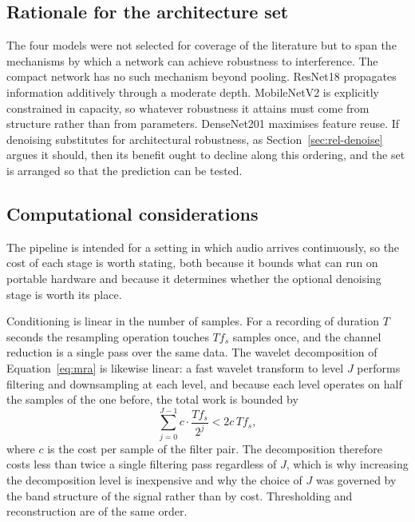\documentclass[pdflatex,sn-mathphys-num]{sn-jnl}
\begin{document}
\subsection{Rationale for the architecture set}\label{sec:d-why}

The four models were not selected for coverage of the literature but to span
the mechanisms by which a network can achieve robustness to interference. The
compact network has no such mechanism beyond pooling. ResNet18 propagates
information additively through a moderate depth. MobileNetV2 is explicitly
constrained in capacity, so whatever robustness it attains must come from
structure rather than from parameters. DenseNet201 maximises feature reuse.
If denoising substitutes for architectural robustness, as
Section~\ref{sec:rel-denoise} argues it should, then its benefit ought to
decline along this ordering, and the set is arranged so that the prediction
can be tested.

\subsection{Computational considerations}\label{sec:d-cost}

The pipeline is intended for a setting in which audio arrives continuously, so
the cost of each stage is worth stating, both because it bounds what can run
on portable hardware and because it determines whether the optional denoising
stage is worth its place.

Conditioning is linear in the number of samples. For a recording of duration
$T$ seconds the resampling operation touches $T f_s$ samples once, and the
channel reduction is a single pass over the same data. The wavelet
decomposition of Equation~\eqref{eq:mra} is likewise linear: a fast wavelet
transform to level $J$ performs filtering and downsampling at each level, and
because each level operates on half the samples of the one before, the total
work is bounded by
\begin{equation}
\sum_{j=0}^{J-1} c \cdot \frac{T f_s}{2^{j}} < 2 c \, T f_s,
\label{eq:cost-dwt}
\end{equation}
where $c$ is the cost per sample of the filter pair. The decomposition
therefore costs less than twice a single filtering pass regardless of $J$,
which is why increasing the decomposition level is inexpensive and why the
choice of $J$ was governed by the band structure of the signal rather than by
cost. Thresholding and reconstruction are of the same order.
\end{document}

